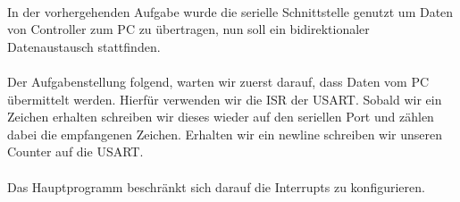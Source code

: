 \paragraph*{}
In der vorhergehenden Aufgabe wurde die serielle Schnittstelle genutzt um Daten von Controller zum PC zu übertragen, nun soll ein bidirektionaler Datenaustausch stattfinden. \\

\paragraph*{}
Der Aufgabenstellung folgend, warten wir zuerst darauf, dass Daten vom PC übermittelt werden. Hierfür verwenden wir die ISR der USART. Sobald wir ein Zeichen erhalten schreiben wir dieses wieder auf den seriellen Port und zählen dabei die empfangenen Zeichen. Erhalten wir ein newline schreiben wir unseren Counter auf die USART. \\



\paragraph*{}
Das Hauptprogramm beschränkt sich darauf die Interrupts zu konfigurieren. \\





